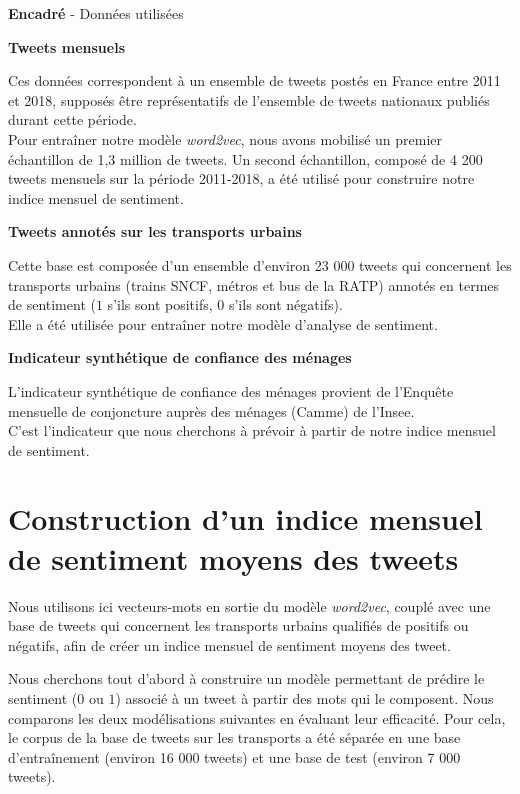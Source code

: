 \documentclass[10pt,french,french]{article}
\newcounter{comptEncadre}
\renewcommand\thecomptEncadre{%
\arabic{comptEncadre}}
\newenvironment{encadre}[2][false]{\refstepcounter{comptEncadre}
\begin{bclogo}[couleur=processblue!5,arrondi=0.1,
logo=\bcloupe,barre=none,couleurBord=blue!60!green,nobreak = #1]{ {\sc \textbf{Encadré \thecomptEncadre}} -  #2}
\smallskip
}{\end{bclogo}}
\begin{document}
\begin{encadre}[true]{Données utilisées}\label{enc:encadre1}

\small

\textbf{Tweets mensuels}

Ces données correspondent à un ensemble de tweets postés en France entre 2011 et 2018, supposés être représentatifs de l'ensemble de tweets nationaux publiés durant cette période. \\
Pour entraîner notre modèle \emph{word2vec}, nous avons mobilisé un premier échantillon de 1,3 million de tweets. Un second échantillon, composé de 4 200 tweets mensuels sur la période 2011-2018, a été utilisé pour construire notre indice mensuel de sentiment. 

\textbf{Tweets annotés sur les transports urbains}

Cette base est composée d'un ensemble d'environ 23 000 tweets qui concernent les transports urbains (trains SNCF, métros et bus de la RATP) annotés en termes de sentiment ($1$ s'ils sont positifs, $0$ s'ils sont négatifs).\\
Elle a été utilisée pour entraîner notre modèle d'analyse de sentiment.

\textbf{Indicateur synthétique de confiance des ménages}

L’indicateur synthétique de confiance des ménages provient de l'Enquête mensuelle de conjoncture auprès des ménages (Camme) de l’Insee.\\
C'est l'indicateur que nous cherchons à prévoir à partir de notre indice mensuel de sentiment.

\end{encadre}

\newpage

\hypertarget{sec:sentimentalAnalysis}{%
\section{Construction d'un indice mensuel de sentiment moyens des tweets}\label{sec:sentimentalAnalysis}}

Nous utilisons ici vecteurs-mots en sortie du modèle \emph{word2vec}, couplé avec une base de tweets qui concernent les transports urbains qualifiés de positifs ou négatifs, afin de créer un indice mensuel de sentiment moyens des tweet.

Nous cherchons tout d'abord à construire un modèle permettant de prédire le sentiment (\(0\) ou \(1\)) associé à un tweet à partir des mots qui le composent. Nous comparons les deux modélisations suivantes en évaluant leur efficacité. Pour cela, le corpus de la base de tweets sur les transports a été séparée en une base d'entraînement (environ 16 000 tweets) et une base de test (environ 7 000 tweets).
\end{document}
